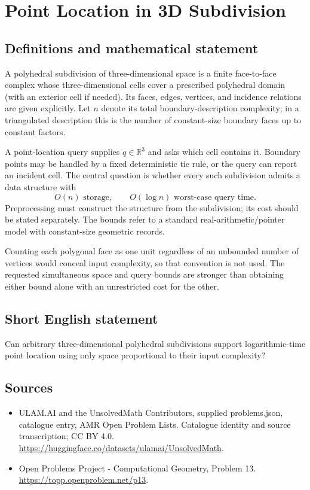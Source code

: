 \documentclass[11pt,a4paper]{article}
\begin{document}
\section*{Point Location in 3D Subdivision}\label{statement}

\subsection{Definitions and mathematical statement}
A polyhedral subdivision of three-dimensional space is a finite
face-to-face complex whose three-dimensional cells cover a prescribed
polyhedral domain (with an exterior cell if needed). Its faces, edges,
vertices, and incidence relations are given explicitly. Let $n$ denote
its total boundary-description complexity; in a triangulated description
this is the number of constant-size boundary faces up to constant factors.

A point-location query supplies $q\in\mathbb R^3$ and asks which cell
contains it. Boundary points may be handled by a fixed deterministic
tie rule, or the query can report an incident cell. The central question
is whether every such subdivision admits a data structure with
\[
                    O(n)\text{ storage},\qquad
                    O(\log n)\text{ worst-case query time}.
\]
Preprocessing must construct the structure from the subdivision; its
cost should be stated separately. The bounds refer to a standard
real-arithmetic/pointer model with constant-size geometric records.

Counting each polygonal face as one unit regardless of an unbounded
number of vertices would conceal input complexity, so that convention
is not used. The requested simultaneous space and query bounds are
stronger than obtaining either bound alone with an unrestricted cost
for the other.
\subsection{Short English statement}
Can arbitrary three-dimensional polyhedral subdivisions support
logarithmic-time point location using only space proportional to their
input complexity?
\subsection{Sources}
\begin{itemize}
\item[S1] ULAM.AI and the UnsolvedMath Contributors, supplied problems.json, catalogue entry, AMR Open Problem Lists. Catalogue identity and source transcription; CC BY 4.0.
\url{https://huggingface.co/datasets/ulamai/UnsolvedMath}.
\item[S2] Open Problems Project - Computational Geometry, Problem 13. 
\url{https://topp.openproblem.net/p13}.
\end{itemize}
\end{document}
